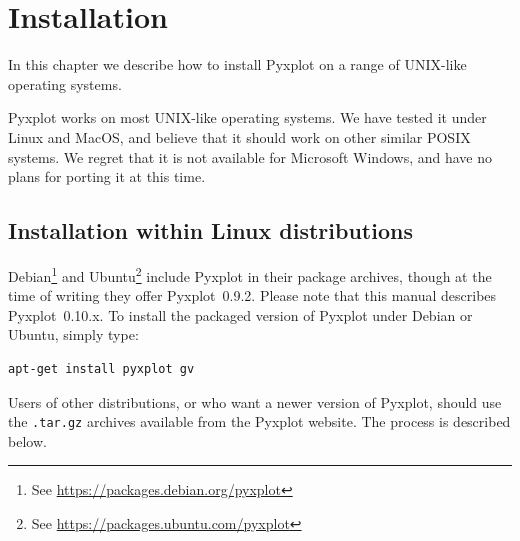 %
%
%
%
%



\chapter{Installation}

\label{ch:installation}

In this chapter we describe how to install Pyxplot on a range of UNIX-like
operating systems.

Pyxplot works on most UNIX-like operating systems. We have tested it under
Linux and MacOS, and believe that it
should work on other similar POSIX systems. We regret that it is not available
for Microsoft Windows, and have no plans for porting it at this time.

\section{Installation within Linux distributions}

Debian\footnote{See
\url{https://packages.debian.org/pyxplot}} and Ubuntu\footnote{See
\url{https://packages.ubuntu.com/pyxplot}} include Pyxplot in their package
archives, though at the time of writing they offer Pyxplot~0.9.2. Please note
that this manual describes Pyxplot~0.10.x. To install the packaged version of
Pyxplot under Debian or Ubuntu, simply type:

\begin{verbatim}
apt-get install pyxplot gv
\end{verbatim}

Users of other distributions, or who want a newer version of Pyxplot, should
use the {\tt .tar.gz} archives available from the Pyxplot website. The process
is described below.

